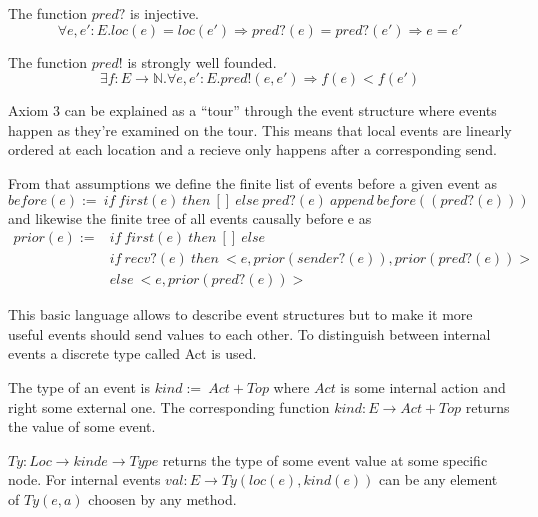 \begin{axiom}
  The function $pred?$ is injective.
  \[\forall e,e':E.loc(e) = loc(e')\Rightarrow pred?(e) = pred?(e')\Rightarrow e=e'\]
\end{axiom}

\begin{axiom}
  The function $pred!$ is strongly well founded.
  \[\exists f:E\rightarrow \mathbb{N}.\forall e,e':E.pred!(e,e')\Rightarrow f(e)<f(e')\]
\end{axiom}

Axiom 3 can be explained as a ``tour'' through the event structure where
events happen as they're examined on the tour. This means that local
events are linearly ordered at each location and a recieve only happens
after a corresponding send.~\cite{bickford2005causal}

From that assumptions we define the finite list of events before a given event as
\[before(e):=\ if\ first(e)\ then\ []\ else\ pred?(e)\ append\ before((pred?(e)))\] 
and likewise the finite tree of all events causally before e as
\begin{align*}
  prior(e):= & if\ first(e)\ then\ []\ else\\
             & if\ recv?(e)\ then\ <e,prior(sender?(e)),prior(pred?(e))>\\
             & else\ <e,prior(pred?(e))>
\end{align*}

This basic language allows to describe event structures but to make
it more useful events should send values to each other. To distinguish
between internal events a discrete type called Act is used.~\cite{bickford2005causal}

\begin{defi}
  The type of an event is $kind :=\ Act + Top$ where $Act$ is some
  internal action and right some external one. The corresponding function
  $kind: E\rightarrow Act + Top$ returns the value of some event.
\end{defi}

\begin{defi}
  $Ty:Loc\rightarrow kinde\rightarrow Type$ returns the type of some event value at some specific
  node. For internal events $val:E\rightarrow Ty(loc(e),kind(e))$ can be any element of
  $Ty(e,a)$ choosen by any method.
\end{defi}





